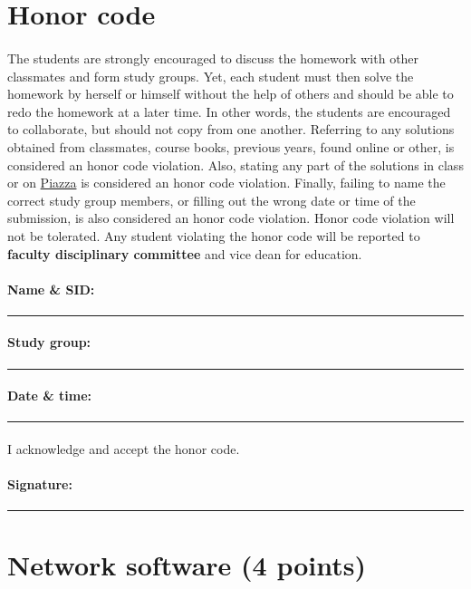 \documentclass[11pt,a4paper]{article}
\begin{document}
\section*{Honor code}

\paragraph{} The students are strongly encouraged to discuss the homework with other classmates and form study groups. Yet, each student must then solve the homework by herself or himself without the help of others and should be able to redo the homework at a later time. In other words, the students are encouraged to collaborate, but should not copy from one another. Referring to any solutions obtained from classmates, course books, previous years, found online or other, is considered an honor code violation. Also, stating any part of the solutions in class or on \href{https://piazza.com}{Piazza} is considered an honor code violation. Finally, failing to name the correct study group members, or filling out the wrong date or time of the submission, is also considered an honor code violation. Honor code violation will not be tolerated. Any student violating the honor code will be reported to {\bf\color{LimeGreen} faculty disciplinary committee} and vice dean for education.

\vspace*{0.15in}
\paragraph{Name \& SID:} \rule{4.5in}{0.5pt}
\paragraph{Study group:} \rule{4.5in}{0.5pt}
\paragraph{Date \& time:} \rule{2.5in}{0.5pt}
\paragraph{} I acknowledge and accept the honor code.
\paragraph{Signature:} \rule{2.5in}{0.5pt}

\pagebreak

\section{Network software ({\color{magenta}4 points})}
\end{document}
